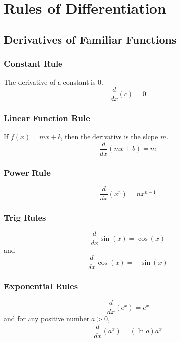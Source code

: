 \documentclass[
]{book}
\begin{document}
\hypertarget{rules-of-differentiation}{%
\chapter{Rules of Differentiation}\label{rules-of-differentiation}}

\hypertarget{derivatives-of-familiar-functions}{%
\section{Derivatives of Familiar Functions}\label{derivatives-of-familiar-functions}}

\hypertarget{constant-rule}{%
\subsection{Constant Rule}\label{constant-rule}}

The derivative of a constant is 0.
\[\frac{d}{dx}(c)= 0\]

\hypertarget{linear-function-rule}{%
\subsection{Linear Function Rule}\label{linear-function-rule}}

If \(f(x)=mx+b\), then the derivative is the slope \(m\).
\[\frac{d}{dx}(mx+b)= m\]

\hypertarget{power-rule}{%
\subsection{Power Rule}\label{power-rule}}

\[\frac{d}{dx}(x^n)=n x^{n-1}\]

\hypertarget{trig-rules}{%
\subsection{Trig Rules}\label{trig-rules}}

\[\frac{d}{dx}\sin(x)=\cos(x)\]
and
\[\frac{d}{dx}\cos(x)=-\sin(x)\]

\hypertarget{exponential-rules}{%
\subsection{Exponential Rules}\label{exponential-rules}}

\[\frac{d}{dx}(e^x)=e^x\]
and for any positive number \(a >0\),
\[\frac{d}{dx}(a^x)=(\ln a)a^x\]
\end{document}
